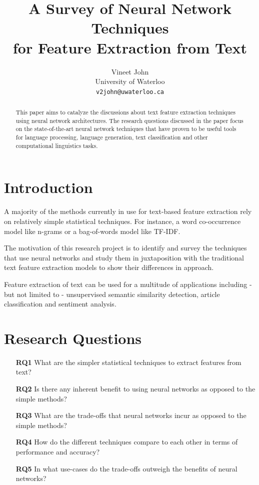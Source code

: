\documentclass[11pt,a4paper]{article}
\title{A Survey of Neural Network Techniques\\ for Feature Extraction from Text}
\author{
  Vineet John \\
  University of Waterloo \\
  {\tt v2john@uwaterloo.ca} \\
}
\date{}
\begin{document}
\maketitle


\begin{abstract}
  This paper aims to catalyze the discussions about text feature extraction techniques using neural network architectures. 
  The research questions discussed in the paper focus on the state-of-the-art neural network techniques that have proven to be useful tools for language processing, language generation, text classification and other computational linguistics tasks.
\end{abstract}


\section{Introduction} %
\label{sec:introduction}

  A majority of the methods currently in use for text-based feature extraction rely on relatively simple statistical techniques. For instance, a word co-occurrence model like n-grams or a bag-of-words model like TF-IDF.

  The motivation of this research project is to identify and survey the techniques that use neural networks and study them in juxtaposition with the traditional text feature extraction models to show their differences in approach.

  Feature extraction of text can be used for a multitude of applications including - but not limited to - unsupervised semantic similarity detection, article classification and sentiment analysis.


\section{Research Questions} %
\label{sec:research_questions}

  \begin{itemize}
    \item [\textbf{RQ1}] 
    What are the simpler statistical techniques to extract features from text?
    \item [\textbf{RQ2}] 
    Is there any inherent benefit to using neural networks as opposed to the simple methods?
    \item [\textbf{RQ3}] 
    What are the trade-offs that neural networks incur as opposed to the simple methods?
    \item [\textbf{RQ4}] 
    How do the different techniques compare to each other in terms of performance and accuracy?
    \item [\textbf{RQ5}] 
    In what use-cases do the trade-offs outweigh the benefits of neural networks?
  \end{itemize}
\end{document}
